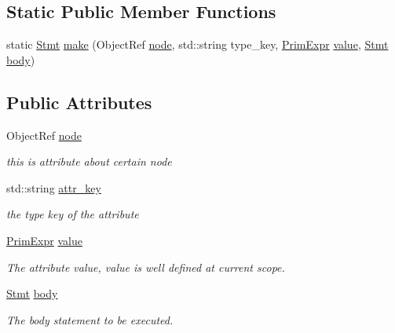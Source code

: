 \subsection*{Static Public Member Functions}
\begin{DoxyCompactItemize}
\item 
static \hyperlink{classtvm_1_1tir_1_1Stmt}{Stmt} \hyperlink{classtvm_1_1tir_1_1AttrStmtNode_afafc72182c9a632e54a22841cf8c6a9a}{make} (Object\+Ref \hyperlink{classtvm_1_1tir_1_1AttrStmtNode_a7dbc9628c9f3f35deaccf0526be4f699}{node}, std\+::string type\+\_\+key, \hyperlink{classtvm_1_1PrimExpr}{Prim\+Expr} \hyperlink{classtvm_1_1tir_1_1AttrStmtNode_a4228adcc9320d1f1ce5f9caba1e4faf9}{value}, \hyperlink{classtvm_1_1tir_1_1Stmt}{Stmt} \hyperlink{classtvm_1_1tir_1_1AttrStmtNode_a67c1ae1a8a7e7032f080aa3f5ae092fb}{body})
\end{DoxyCompactItemize}
\subsection*{Public Attributes}
\begin{DoxyCompactItemize}
\item 
Object\+Ref \hyperlink{classtvm_1_1tir_1_1AttrStmtNode_a7dbc9628c9f3f35deaccf0526be4f699}{node}
\begin{DoxyCompactList}\small\item\em this is attribute about certain node \end{DoxyCompactList}\item 
std\+::string \hyperlink{classtvm_1_1tir_1_1AttrStmtNode_a2c5d6997043fa5ace4180c41bb554e89}{attr\+\_\+key}
\begin{DoxyCompactList}\small\item\em the type key of the attribute \end{DoxyCompactList}\item 
\hyperlink{classtvm_1_1PrimExpr}{Prim\+Expr} \hyperlink{classtvm_1_1tir_1_1AttrStmtNode_a4228adcc9320d1f1ce5f9caba1e4faf9}{value}
\begin{DoxyCompactList}\small\item\em The attribute value, value is well defined at current scope. \end{DoxyCompactList}\item 
\hyperlink{classtvm_1_1tir_1_1Stmt}{Stmt} \hyperlink{classtvm_1_1tir_1_1AttrStmtNode_a67c1ae1a8a7e7032f080aa3f5ae092fb}{body}
\begin{DoxyCompactList}\small\item\em The body statement to be executed. \end{DoxyCompactList}\end{DoxyCompactItemize}
